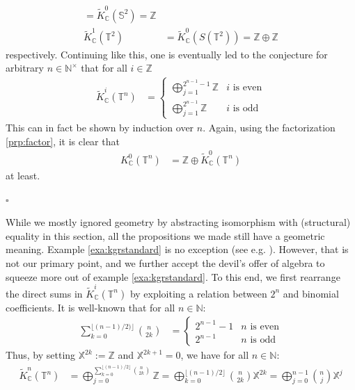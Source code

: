 \begin{exa}
\begin{enumerate}
\begin{align*}
  =
  \tilde{K}_{\mathbb{C}}^{0}(\mathbb{S}^{2})
  =
  \mathbb{Z}
  \\
  \tilde{K}_{\mathbb{C}}^{1}(\mathbb{T}^{2})
  &=
  \tilde{K}_{\mathbb{C}}^{0}(S(\mathbb{T}^{2}))
  =
  \mathbb{Z} \oplus \mathbb{Z}
\end{align*}
respectively.
Continuing like this, one is eventually led to the conjecture for arbitrary $n \in \mathbb{N}^{\times}$ that for all $i \in \mathbb{Z}$
\begin{align*}
  \tilde{K}_{\mathbb{C}}^{i}(\mathbb{T}^{n})
  &=
  \begin{cases}
    \bigoplus_{j=1}^{2^{n-1}-1}
    \mathbb{Z}
    &
    \text{$i$ is even}
    \\
    \bigoplus_{j=1}^{2^{n-1}}
    \mathbb{Z}
    &
    \text{$i$ is odd}
  \end{cases}
\end{align*}
This can in fact be shown by induction over $n$.
Again, using the factorization \ref{prp:factor}, it is clear that
\begin{align*}
  K_{\mathbb{C}}^{0}(\mathbb{T}^{n})
  &=
  \mathbb{Z}
  \oplus
  \tilde{K}_{\mathbb{C}}^{0}(\mathbb{T}^{n})
\end{align*}
at least.
\end{enumerate}
\phantom{proven}
\hfill
$\square$
\end{exa}
While we mostly ignored geometry by abstracting isomorphism with (structural) equality in this section, all the propositions we made still have a geometric meaning.
Example \ref{exa:kgrstandard} is no exception (see e.g. \cite{c7f15065}).
However, that is not our primary point, and we further accept {\glqq}the devil's offer of algebra{\grqq} to squeeze more out of example \ref{exa:kgrstandard}. To this end, we first rearrange the direct sums in $\tilde{K}_{\mathbb{C}}^{i}(\mathbb{T}^{n})$ by exploiting a relation between $2^{n}$ and binomial coefficients.
It is well-known that for all $n \in \mathbb{N}$:
\begin{align*}
  \sum_{k=0}^{\lfloor (n - 1)/2) \rfloor}\binom{n}{2k}
  &=
  \begin{cases}
    2^{n-1} - 1
    &
    \text{$n$ is even}
    \\
    2^{n-1}
    &
    \text{$n$ is odd}
  \end{cases}
\end{align*}
Thus, by setting $\mathbb{X}^{2k} := \mathbb{Z}$ and $\mathbb{X}^{2k+1} = 0$, we have for all $n \in \mathbb{N}$:
\begin{align*}
  \tilde{K}_{\mathbb{C}}^{n}(\mathbb{T}^{n})
  &=
  \bigoplus_{j=0}^{\sum_{k=0}^{\lfloor (n - 1)/2 \rfloor}\binom{n}{2k}}
  \mathbb{Z}
  =
  \bigoplus_{k=0}^{\lfloor (n - 1)/2 \rfloor}
  \binom{n}{2k}
  \mathbb{X}^{2k}
  =
  \bigoplus_{j=0}^{n-1}
  \binom{n}{j}
  \mathbb{X}^{j}
\end{align*}
